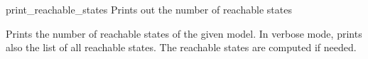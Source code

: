 \begin{nusmvCommand}{print\_reachable\_states} {Prints out the number of reachable states}


Prints the number of reachable states of the given model. In verbose
mode, prints also the list of all reachable states.  The reachable
states are computed if needed.

\end{nusmvCommand}
